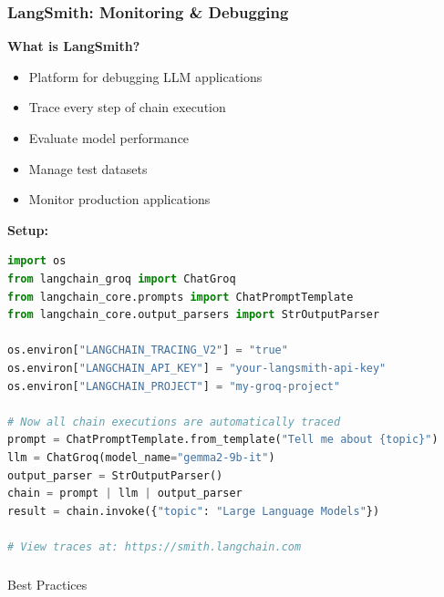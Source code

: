 \begin{frame}[fragile]\frametitle{LangSmith: Monitoring \& Debugging}

\textbf{What is LangSmith?}
\begin{itemize}
\item Platform for debugging LLM applications
\item Trace every step of chain execution
\item Evaluate model performance
\item Manage test datasets
\item Monitor production applications
\end{itemize}

\textbf{Setup:}
\begin{lstlisting}[language=python, basicstyle=\tiny]
import os
from langchain_groq import ChatGroq
from langchain_core.prompts import ChatPromptTemplate
from langchain_core.output_parsers import StrOutputParser

os.environ["LANGCHAIN_TRACING_V2"] = "true"
os.environ["LANGCHAIN_API_KEY"] = "your-langsmith-api-key"
os.environ["LANGCHAIN_PROJECT"] = "my-groq-project"

# Now all chain executions are automatically traced
prompt = ChatPromptTemplate.from_template("Tell me about {topic}")
llm = ChatGroq(model_name="gemma2-9b-it")
output_parser = StrOutputParser()
chain = prompt | llm | output_parser
result = chain.invoke({"topic": "Large Language Models"})

# View traces at: https://smith.langchain.com
\end{lstlisting}

\end{frame}

\begin{frame}[fragile]\frametitle{}
\begin{center}
{\Large Best Practices}
\end{center}
\end{frame}

